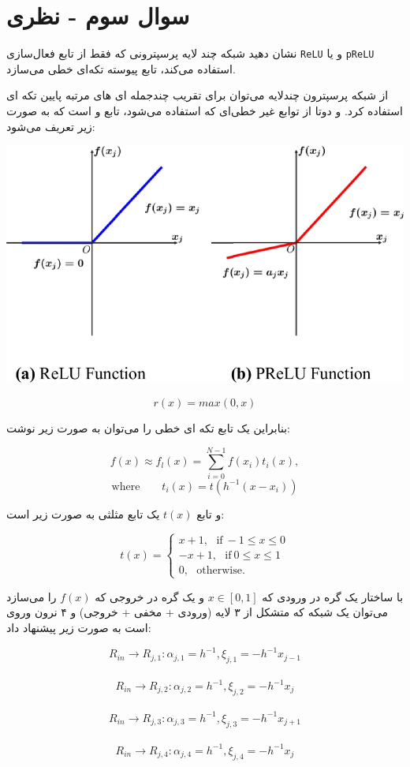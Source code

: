 \section{سوال سوم - نظری}

نشان دهید شبکه چند لایه پرسپترونی که فقط از تابع فعال‌سازی \texttt{ReLU} و یا \texttt{pReLU} استفاده می‌کند، تابع پیوسته تکه‌ای خطی می‌سازد.


\begin{qsolve}
از شبکه پرسپترون چند‌لایه می‌توان برای تقریب چند‌جمله ای های مرتبه پایین تکه ای استفاده کرد. \cite{ref1} و \cite{ref2}
دوتا از توابع غیر خطی‌ای که استفاده می‌شود، تابع  و  است که به صورت زیر تعریف می‌شود:

	\begin{center}
		\includegraphics*[width=0.5\linewidth]{pics/img10.png}
		\label{توابع فعالساز رلو و پی رلو}
	\end{center}

	$$ r(x)=max(0, x) $$
	
	بنابراین یک تابع تکه ای خطی را می‌توان به صورت زیر نوشت:
	
	$$ f(x)\approx f_l(x)=\sum_{i=0}^{N-1} f(x_i)t_i(x), $$
	$$ \text{where} \qquad t_i(x)=t(h^{-1}(x-x_i)) $$
	
	و تابع $t(x)$ یک تابع مثلثی به صورت زیر است:
	
	$$
	t(x)=
	\begin{cases}
		x+1, \ \ \  \text{if} \ -1\le x \le 0 \\
		-x+1, \ \ \ \text{if} \ 0\le x \le 1 \\
		0,     \ \ \ \text{otherwise.}
	\end{cases}
	$$
	
	با ساختار یک گره در ورودی که $x \in [0,1]$ و یک گره در خروجی که $f(x)$ را می‌سازد می‌توان یک شبکه  که متشکل از ۳ لایه (ورودی + مخفی + خروجی) و ۴ نرون وروی است به صورت زیر پیشنهاد داد:
	
	$$ R_{in} \rightarrow R_{j, 1}: \alpha_{j, 1}=h^{-1}, \xi_{j,1}=-h^{-1}x_{j-1} $$ \\
	$$ R_{in} \rightarrow R_{j, 2}: \alpha_{j, 2}=h^{-1}, \xi_{j,2}=-h^{-1}x_{j} $$ \\
	$$ R_{in} \rightarrow R_{j, 3}: \alpha_{j, 3}=h^{-1}, \xi_{j,3}=-h^{-1}x_{j+1} $$ \\
	$$ R_{in} \rightarrow R_{j, 4}: \alpha_{j, 4}=h^{-1}, \xi_{j,4}=-h^{-1}x_{j} $$ \\
	
\end{qsolve}




